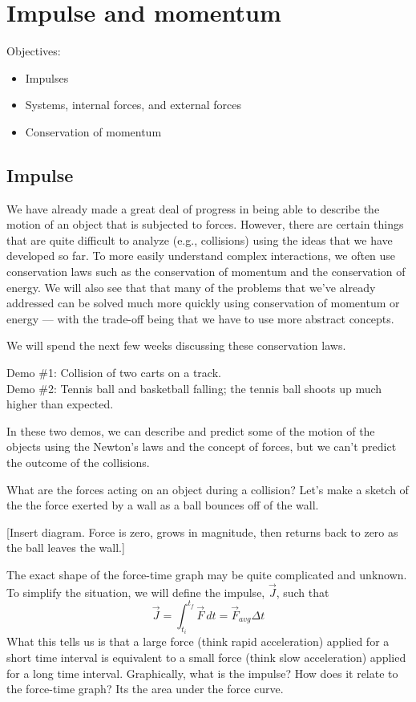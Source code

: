 \section{Impulse and momentum}
Objectives:
\begin{itemize}
\item Impulses
\item Systems, internal forces, and external forces
\item Conservation of momentum
\end{itemize}

\hrulefill

\subsection{Impulse}
We have already made a great deal of progress in being able to describe the motion of an object that is subjected to forces. However, there are certain things that are quite difficult to analyze (e.g., collisions) using the ideas that we have developed so far. To more easily understand complex interactions, we often use conservation laws such as the conservation of momentum and the conservation of energy. We will also see that that many of the problems that we've already addressed can be solved much more quickly using conservation of momentum or energy --- with the trade-off being that we have to use more abstract concepts.

We will spend the next few weeks discussing these conservation laws.

Demo \#1: Collision of two carts on a track.\\
Demo \#2: Tennis ball and basketball falling; the tennis ball shoots up much higher than expected.

In these two demos, we can describe and predict some of the motion of the objects using the Newton's laws and the concept of forces, but we can't predict the outcome of the collisions.

What are the forces acting on an object during a collision? Let's make a sketch of the the force exerted by a wall as a ball bounces off of the wall.

[Insert diagram. Force is zero, grows in magnitude, then returns back to zero as the ball leaves the wall.]
\vspace{5cm}

The exact shape of the force-time graph may be quite complicated and unknown. To simplify the situation, we will define the impulse, $\vec{J}$, such that 
$$\vec{J}=\displaystyle\int_{t_i}^{t_f}\vec{F}\,dt=\vec{F}_{avg}\Delta{t}$$
What this tells us is that a large force (think rapid acceleration) applied for a short time interval is equivalent to a small force (think slow acceleration) applied for a long time interval. Graphically, what is the impulse? How does it relate to the force-time graph? Its the area under the force curve.

